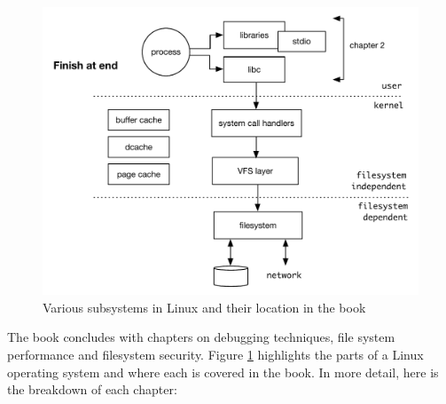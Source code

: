 \begin{figure}[h]
	\includegraphics[scale=0.6]{figures/intro-figure.pdf}
	\centering
	\caption{Various subsystems in Linux and their location in the book}
	\label{fig:intro-figure}
\end{figure}

The book concludes with chapters on debugging techniques, file system performance and filesystem security. Figure \ref{fig:intro-figure} highlights the parts of a Linux operating system and where each is covered in the book. In more detail, here is the breakdown of each chapter:

